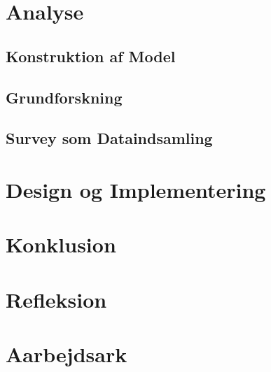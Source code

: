 \chapter{Analyse}

\section{Konstruktion af Model}
\section{Grundforskning}


\section{Survey som Dataindsamling}

\chapter{Design og Implementering}

\chapter{Konklusion}

\chapter{Refleksion}


\chapter{Aarbejdsark}




\appendix




